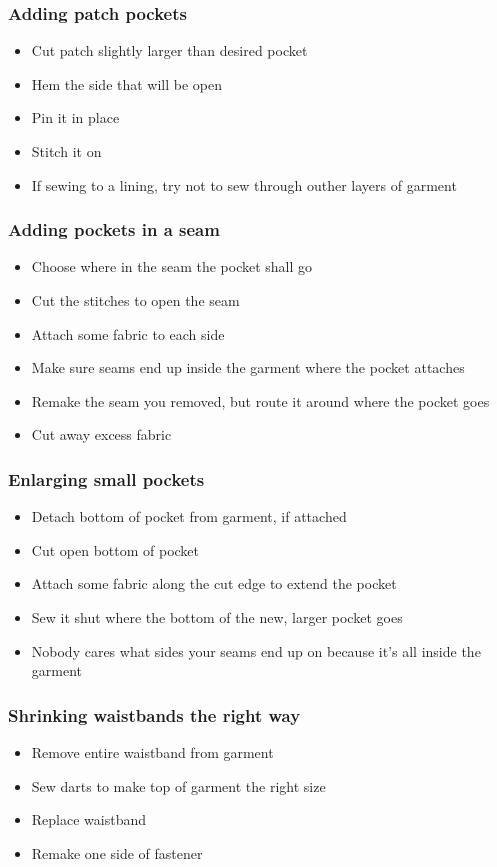 \documentclass{beamer}
\begin{document}
\begin{frame}[fragile]
\frametitle{Adding patch pockets}
\begin{itemize}
\item Cut patch slightly larger than desired pocket
\item Hem the side that will be open
\item Pin it in place
\item Stitch it on
\item If sewing to a lining, try not to sew through outher layers of garment
\end{itemize}
\end{frame}

\begin{frame}[fragile]
\frametitle{Adding pockets in a seam}
\begin{itemize}
\item Choose where in the seam the pocket shall go
\item Cut the stitches to open the seam
\item Attach some fabric to each side
\item Make sure seams end up inside the garment where the pocket attaches
\item Remake the seam you removed, but route it around where the pocket goes
\item Cut away excess fabric
\end{itemize}
\end{frame}

\begin{frame}[fragile]
\frametitle{Enlarging small pockets}
\begin{itemize}
\item Detach bottom of pocket from garment, if attached
\item Cut open bottom of pocket
\item Attach some fabric along the cut edge to extend the pocket
\item Sew it shut where the bottom of the new, larger pocket goes
\item Nobody cares what sides your seams end up on because it's all inside the garment
\end{itemize}
\end{frame}

\begin{frame}[fragile]
\frametitle{Shrinking waistbands the right way}
\begin{itemize}
\item Remove entire waistband from garment
\item Sew darts to make top of garment the right size
\item Replace waistband
\item Remake one side of fastener
\end{itemize}
\end{frame}
\end{document}
